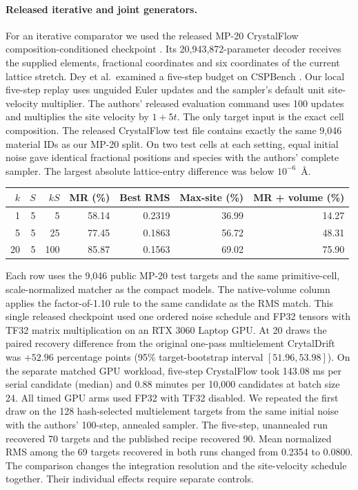 \paragraph{Released iterative and joint generators.}
For an iterative comparator we used the released MP-20 CrystalFlow composition-conditioned checkpoint \cite{crystalflow}. Its 20,943,872-parameter decoder receives the supplied elements, fractional coordinates and six coordinates of the current lattice stretch. Dey et al.\ examined a five-step budget on CSPBench \cite{uflow}. Our local five-step replay uses unguided Euler updates and the sampler's default unit site-velocity multiplier. The authors' released evaluation command uses 100 updates and multiplies the site velocity by $1+5t$. The only target input is the exact cell composition. The released CrystalFlow test file contains exactly the same 9,046 material IDs as our MP-20 split.
On two test cells at each setting, equal initial noise gave identical fractional positions and species with the authors' complete sampler. The largest absolute lattice-entry difference was below $10^{-6}$~\AA.

\begin{center}\small\begin{tabular}{rrrrrrr}\hline
$k$ & $S$ & $kS$ & MR (\%) & Best RMS & Max-site (\%) & MR + volume (\%)\\\hline
1 & 5 & 5 & 58.14 & 0.2319 & 36.99 & 14.27\\
5 & 5 & 25 & 77.45 & 0.1863 & 56.72 & 48.31\\
20 & 5 & 100 & 85.87 & 0.1563 & 69.02 & 75.90\\
\hline\end{tabular}\end{center}
Each row uses the 9,046 public MP-20 test targets and the same primitive-cell, scale-normalized matcher as the compact models. The native-volume column applies the factor-of-1.10 rule to the same candidate as the RMS match. This single released checkpoint used one ordered noise schedule and FP32 tensors with TF32 matrix multiplication on an RTX 3060 Laptop GPU.
At 20 draws the paired recovery difference from the original one-pass multielement CrytalDrift was $+52.96$ percentage points (95\% target-bootstrap interval $[51.96,53.98]$).
On the separate matched GPU workload, five-step CrystalFlow took 143.08 ms per serial candidate (median) and 0.88 minutes per 10,000 candidates at batch size 24. All timed GPU arms used FP32 with TF32 disabled.
We repeated the first draw on the 128 hash-selected multielement targets from the same initial noise with the authors' 100-step, annealed sampler. The five-step, unannealed run recovered 70 targets and the published recipe recovered 90. Mean normalized RMS among the 69 targets recovered in both runs changed from 0.2354 to 0.0800.
The comparison changes the integration resolution and the site-velocity schedule together.
Their individual effects require separate controls.

